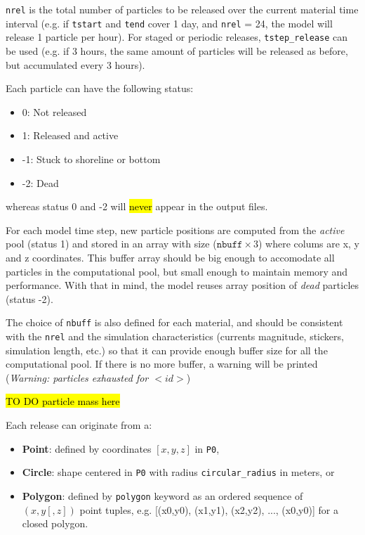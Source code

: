 \documentclass[a4paper]{article}
\begin{document}
\texttt{nrel} is the total number of particles to be released over the current material time interval (e.g. if \texttt{tstart} and \texttt{tend} cover 1 day, and \texttt{nrel} = 24, the model will release 1 particle per hour). For staged or periodic releases, \texttt{tstep\_release} can be used (e.g. if 3 hours, the same amount of particles will be released as before, but accumulated every 3 hours).

Each particle can have the following status:

\begin{itemize}
\item 0: Not released
\item 1: Released and active
\item -1: Stuck to shoreline or bottom
\item -2: Dead
\end{itemize}
 
whereas status 0 and -2 will \hl{never} appear in the output files.

For each model time step, new particle positions are computed from the \textit{active} pool (status 1) and stored in an array with size ($\texttt{nbuff}\times 3$)  where colums are x, y and z coordinates. This buffer array should be big enough to accomodate all particles in the computational pool, but small enough to maintain memory and performance. With that in mind, the model reuses array position of \textit{dead} particles (status -2). 


The choice of \texttt{nbuff} is also defined for each material, and should be consistent with the \texttt{nrel} and the simulation characteristics (currents magnitude, stickers, simulation length, etc.) so that it can provide enough buffer size for all the computational pool. If there is no more buffer, a warning will be printed (\textit{Warning: particles exhausted for  $<id>$})

\bigskip

\hl{TO DO particle mass here}

\bigskip

Each release can originate from a:

\begin{itemize} 
\item \textbf{Point}: defined by coordinates $[x,y,z]$ in \texttt{P0}, 
\item \textbf{Circle}: shape centered in  \texttt{P0} with radius \texttt{circular\_radius} in meters, or
\item \textbf{Polygon}: defined by \texttt{polygon} keyword as an ordered sequence of $(x, y[, z])$ point tuples, e.g. [(x0,y0), (x1,y1), (x2,y2), ..., (x0,y0)] for a closed polygon.
\end{itemize}
\end{document}
